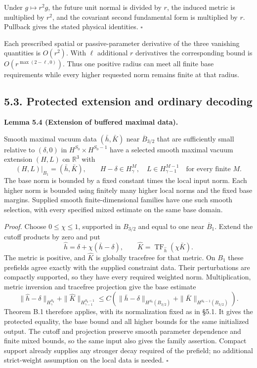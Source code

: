 \documentclass[
  english,
  11pt,
  reqno]{amsart}
\makeatletter
\newcommand{\paperdisplaynext}{%
  \let\paper@savedstartsection\@startsection
  \def\@startsection##1##2##3##4##5##6{%
    \let\@startsection\paper@savedstartsection
    \@tempskipa ##5\relax
    \ifdim\@tempskipa<\z@
      \def\paper@afterskip{.35\baselineskip}%
    \else
      \def\paper@afterskip{##5}%
    \fi
    \@startsection{##1}{##2}{##3}{##4}{\paper@afterskip}{##6}}}
\newcommand{\paperdisplaysection}{\paperdisplaynext\subsection}
\newcommand{\pandocstatementheading}[1]{%
  \par\if@nobreak\else
    \addpenalty{\@beginparpenalty}%
    \addvspace{.5\baselineskip plus .2\baselineskip minus .2\baselineskip}%
  \fi
  {\normalfont\bfseries #1\par}%
  \nobreak\@afterindenttrue\@afterheading
}
\let\paper@displaysection\paperdisplaysection
\renewcommand{\paperdisplaysection}[1]{%
  \let\paper@savedhangfrom\@hangfrom
  \long\def\@hangfrom##1##2{%
    \paper@savedhangfrom{##1}{\paper@headingparagraph##2}}%
  \paper@displaysection{#1}%
  \let\@hangfrom\paper@savedhangfrom}
\makeatother
\begin{document}
Under \(g\mapsto r^2g\), the future unit normal is divided by \(r\), the
induced metric is multiplied by \(r^2\), and the covariant second
fundamental form is multiplied by \(r\). Pullback gives the stated
physical identities. \hfill\(\square\)

Each prescribed spatial or passive-parameter derivative of the three
vanishing quantities is \(O(r^2)\). With \(\ell\) additional \(r\)
derivatives the corresponding bound is \(O(r^{\max(2-\ell,0)})\). Thus
one positive radius can meet all finite base requirements while every
higher requested norm remains finite at that radius.

\paperdisplaysection{5.3. Protected extension and ordinary
decoding}\label{protected-extension-and-ordinary-decoding}\label{sec:submission-protected-extension}

\pandocstatementheading{\leavevmode{}\label{lem:submission-buffered-maximal-extension}Lemma 5.4 (Extension of buffered maximal data).}

Smooth maximal vacuum data \((\bar h,\bar K)\) near
\(\overline B_{3/2}\) that are sufficiently small relative to
\((\delta,0)\) in \(H^{S_0}\times H^{S_0-1}\) have a selected smooth
maximal vacuum extension \((H,L)\) on \(\mathbb R^3\) with%
 \[
(H,L)|_{B_1}=(\bar h,\bar K),
\qquad
H-\delta\in H^M_\gamma,
\quad
L\in H^{M-1}_{\gamma-1}
\quad\text{for every finite }M.
\] The base norm is bounded by a fixed constant times the local input
norm. Each higher norm is bounded using finitely many higher local norms
and the fixed base margins. Supplied smooth finite-dimensional families
have one such smooth selection, with every specified mixed estimate on
the same base domain.

\emph{Proof.} Choose \(0\le\chi\le1\), supported in \(B_{3/2}\) and
equal to one near \(\overline B_1\). Extend the cutoff products by zero
and put%
 \[
\widehat h=\delta+\chi(\bar h-\delta),
\qquad
\widehat K=\operatorname{TF}_{\widehat h}(\chi\bar K).
\] The metric is positive, and \(\widehat K\) is globally tracefree for
that metric. On \(B_1\) these prefields agree exactly with the supplied
constraint data. Their perturbations are compactly supported, so they
have every required weighted norm. Multiplication, metric inversion and
tracefree projection give the base estimate%
 \[
\|\widehat h-\delta\|_{H^{S_0}_\gamma}
+\|\widehat K\|_{H^{S_0-1}_{\gamma-1}}
\le
C\left(
\|\bar h-\delta\|_{H^{S_0}(B_{3/2})}
+\|\bar K\|_{H^{S_0-1}(B_{3/2})}
\right).
\] Theorem B.1 therefore applies, with its normalization fixed as in
§5.1. It gives the protected equality, the base bound and all higher
bounds for the same initialized output. The cutoff and projection
preserve smooth parameter dependence and finite mixed bounds, so the
same input also gives the family assertion. Compact support already
supplies any stronger decay required of the prefield; no additional
strict-weight assumption on the local data is needed. \hfill\(\square\)
\end{document}

